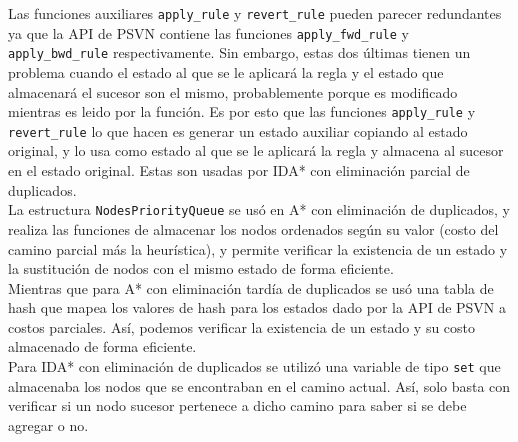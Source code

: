 \documentclass[a4paper,10pt]{article}
\begin{document}
    Las funciones auxiliares \verb|apply_rule| y \verb|revert_rule| pueden parecer
    redundantes ya que la API de PSVN contiene las funciones \verb|apply_fwd_rule|
    y \verb|apply_bwd_rule| respectivamente. Sin embargo, estas dos \'ultimas tienen
    un problema cuando el estado al que se le aplicar\'a la regla y el estado que 
    almacenar\'a el sucesor son el mismo, probablemente porque es modificado mientras 
    es leido por la funci\'on. Es por esto que las funciones \verb|apply_rule| y 
    \verb|revert_rule| lo que hacen es generar un estado auxiliar copiando al estado 
    original, y lo usa como estado al que se le aplicar\'a la regla y almacena al 
    sucesor en el estado original. Estas son usadas por IDA* con eliminaci\'on parcial 
    de duplicados. \\

    La estructura \verb|NodesPriorityQueue| se us\'o en A* con eliminaci\'on de 
    duplicados, y realiza las funciones de almacenar los nodos ordenados seg\'un su 
    valor (costo del camino parcial m\'as la heur\'istica), y permite verificar la 
    existencia de un estado y la sustituci\'on de nodos con el mismo estado de forma 
    eficiente. \\

    Mientras que para A* con eliminaci\'on tard\'ia de duplicados se us\'o una tabla
    de hash que mapea los valores de hash para los estados dado por la API de PSVN 
    a costos parciales. As\'i, podemos verificar la existencia de un estado y su costo 
    almacenado de forma eficiente. \\ 

    Para IDA* con eliminaci\'on de duplicados se utiliz\'o una variable de tipo 
    \verb|set| que almacenaba los nodos que se encontraban en el camino actual. As\'i,
    solo basta con verificar si un nodo sucesor pertenece a dicho camino para saber 
    si se debe agregar o no.
\end{document}

